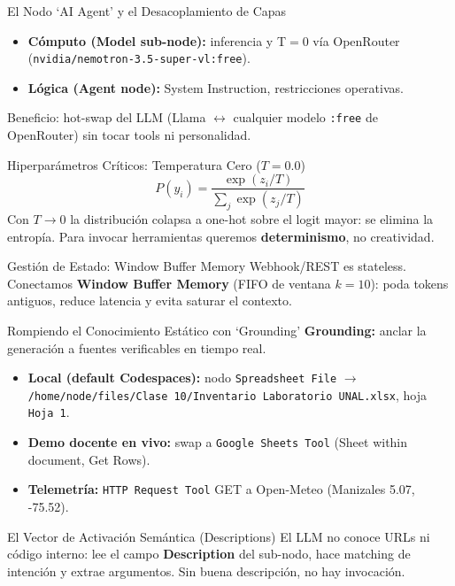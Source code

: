 \documentclass[aspectratio=169,11pt]{beamer}
\begin{document}
\begin{frame}{El Nodo `AI Agent' y el Desacoplamiento de Capas}
  \begin{itemize}
    \item \textbf{Cómputo (Model sub-node):} inferencia y T$=0$ vía OpenRouter (\texttt{nvidia/nemotron-3.5-super-vl:free}).
    \item \textbf{Lógica (Agent node):} System Instruction, restricciones operativas.
  \end{itemize}
  Beneficio: hot-swap del LLM (Llama $\leftrightarrow$ cualquier modelo \texttt{:free} de OpenRouter) sin tocar tools ni personalidad.
\end{frame}

\begin{frame}{Hiperparámetros Críticos: Temperatura Cero ($T=0.0$)}
  \begin{equation*}
    P(y_i) = \frac{\exp(z_i/T)}{\sum_j \exp(z_j/T)}
  \end{equation*}
  Con $T \to 0$ la distribución colapsa a one-hot sobre el logit mayor: se elimina la entropía.
  Para invocar herramientas queremos \textbf{determinismo}, no creatividad.
\end{frame}

\begin{frame}{Gestión de Estado: Window Buffer Memory}
  Webhook/REST es stateless. Conectamos \textbf{Window Buffer Memory} (FIFO de ventana $k=10$):
  poda tokens antiguos, reduce latencia y evita saturar el contexto.
\end{frame}

\begin{frame}{Rompiendo el Conocimiento Estático con `Grounding'}
  \textbf{Grounding:} anclar la generación a fuentes verificables en tiempo real.
  \begin{itemize}
    \item \textbf{Local (default Codespaces):} nodo \texttt{Spreadsheet File} $\to$ \texttt{/home/node/files/Clase 10/Inventario Laboratorio UNAL.xlsx}, hoja \texttt{Hoja 1}.
    \item \textbf{Demo docente en vivo:} swap a \texttt{Google Sheets Tool} (Sheet within document, Get Rows).
    \item \textbf{Telemetría:} \texttt{HTTP Request Tool} GET a Open-Meteo (Manizales 5.07, -75.52).
  \end{itemize}
\end{frame}

\begin{frame}{El Vector de Activación Semántica (Descriptions)}
  El LLM no conoce URLs ni código interno: lee el campo \textbf{Description} del sub-nodo,
  hace matching de intención y extrae argumentos. Sin buena descripción, no hay invocación.
\end{frame}
\end{document}
